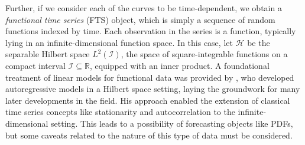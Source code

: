 \documentclass[
	12pt,				%
	oneside,			%
	a4paper,			%
	english,			%
	brazil				%
	]{abntex2ppgsi}
\begin{document}


Further, if we consider each of the curves to be time-dependent, we obtain a \emph{functional time series} (FTS) object, which is simply a sequence of random functions indexed by time. Each observation in the series is a function, typically lying in an infinite-dimensional function space. In this case, let $\mathcal{H}$ be the separable Hilbert space $L^2(\mathcal{I})$, the space of square-integrable functions on a compact interval $\mathcal{I} \subseteq \mathbb{R}$, equipped with an inner product. A foundational treatment of linear models for functional data was provided by , who developed autoregressive models in a Hilbert space setting, laying the groundwork for many later developments in the field. His approach enabled the extension of classical time series concepts like stationarity and autocorrelation to the infinite-dimensional setting. This leads to a possibility of forecasting objects like PDFs, but some caveats related to the nature of this type of data must be considered. 




\end{document}
